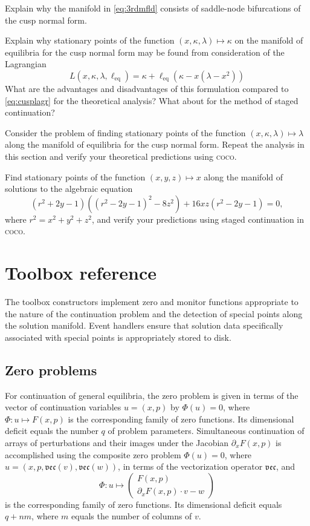 \begin{exercises}
\item Explain why the manifold in \eqref{eq:3rdmfld} consists of saddle-node bifurcations of the cusp normal form.
\item Explain why stationary points of the function $(x,\kappa,\lambda)\mapsto\kappa$ on the manifold of equilibria for the cusp normal form may be found from consideration of the Lagrangian
\[
L(x,\kappa,\lambda,\ell_\mathrm{eq})=\kappa+\ell_\mathrm{eq}(\kappa-x\left(\lambda-x^2\right))
\]
What are the advantages and disadvantages of this formulation compared to \eqref{eq:cusplagr} for the theoretical analysis? What about for the method of staged continuation?
\item Consider the problem of finding stationary points of the function $(x,\kappa,\lambda)\mapsto\lambda$ along the manifold of equilibria for the cusp normal form. Repeat the analysis in this section and verify your theoretical predictions using \textsc{coco}.
\item Find stationary points of the function $(x,y,z)\mapsto x$ along the manifold of solutions to the algebraic equation
\[
(r^2+2y-1)\left((r^2-2y-1)^2-8z^2\right)+16xz(r^2-2y-1)=0,
\]
where $r^2=x^2+y^2+z^2$, and verify your predictions using staged continuation in \textsc{coco}.
\end{exercises}

\section{Toolbox reference}
The toolbox constructors implement zero and monitor functions appropriate to the nature of the continuation problem and the detection of special points along the solution manifold. Event handlers ensure that solution data specifically associated with special points is appropriately stored to disk.

\subsection{Zero problems}
For continuation of general equilibria, the zero problem is given in terms of the vector of continuation variables $u=(x,p)$ by $\Phi(u)=0$, where $\Phi:u\mapsto F(x,p)$ is the corresponding family of zero functions. Its dimensional deficit equals the number $q$ of problem parameters. Simultaneous continuation of arrays of perturbations and their images under the Jacobian $\partial_x F(x,p)$ is accomplished using the composite zero problem $\Phi(u)=0$, where $u=(x,p,\mathfrak{vec}(v),\mathfrak{vec}(w))$, in terms of the vectorization operator $\mathfrak{vec}$, and
\begin{equation}
\Phi:u\mapsto \begin{pmatrix} F(x,p)\\\partial_x F(x,p)\cdot v-w\end{pmatrix}
\label{eq: var}
\end{equation}
is the corresponding family of zero functions. Its dimensional deficit equals $q+nm$, where $m$ equals the number of columns of $v$.

